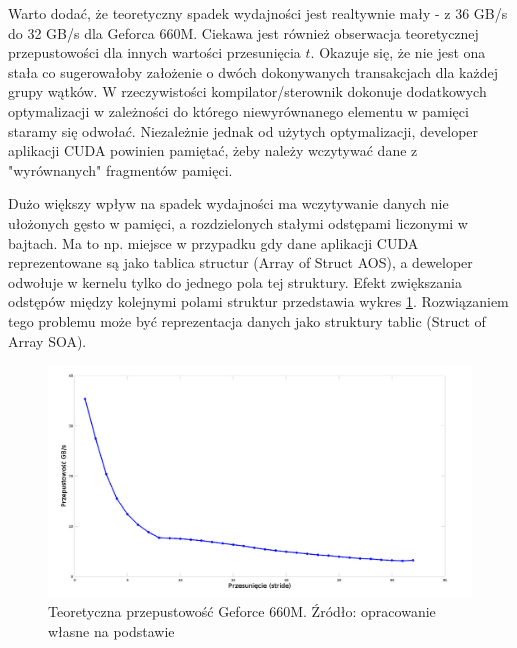 Warto dodać, że teoretyczny spadek wydajności jest realtywnie
mały - z 36 GB/s do 32 GB/s dla Geforca 660M. Ciekawa jest również obserwacja
teoretycznej przepustowości dla innych wartości przesunięcia $t$. Okazuje się,
			 że nie jest ona stała co sugerowałoby założenie o dwóch dokonywanych
			 transakcjach dla każdej grupy wątków. W rzeczywistości
			 kompilator/sterownik dokonuje dodatkowych optymalizacji w
			 zależności do którego niewyrównanego elementu w pamięci staramy się
			 odwołać. Niezależnie jednak od użytych optymalizacji, developer aplikacji CUDA
			 powinien pamiętać, żeby należy wczytywać dane z "wyrównanych"
			 fragmentów pamięci.

Dużo większy wpływ na spadek wydajności ma wczytywanie danych nie ułożonych gęsto w
pamięci, a rozdzielonych stałymi odstępami liczonymi w bajtach. Ma to np. miejsce w przypadku gdy
dane aplikacji CUDA reprezentowane są jako tablica structur (Array of Struct AOS), a deweloper
odwołuje w kernelu tylko do jednego pola tej struktury. Efekt zwiększania odstępów
między kolejnymi polami struktur przedstawia wykres \ref{hier}. Rozwiązaniem tego
problemu może być reprezentacja danych jako struktury tablic (Struct of Array
		SOA).

\begin{figure}[H]
\centering
\includegraphics[scale=0.4]{images/gf660_stride.png}
\caption{Teoretyczna przepustowość Geforce 660M. Źródło: opracowanie własne na
	podstawie \cite{memperf}}
\label{hier}
\end{figure}
